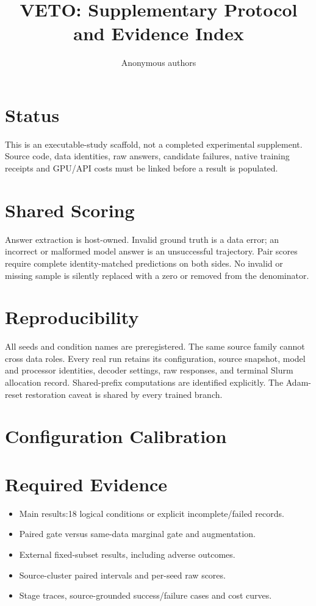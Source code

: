 \documentclass[10pt,twocolumn,letterpaper]{article}
\title{VETO: Supplementary Protocol and Evidence Index}
\author{Anonymous authors}
\begin{document}
\maketitle
\section{Status}
This is an executable-study scaffold, not a completed experimental supplement.
Source code, data identities, raw answers, candidate failures, native training
receipts and GPU/API costs must be linked before a result is populated.
\section{Shared Scoring}
Answer extraction is host-owned. Invalid ground truth is a data error; an
incorrect or malformed model answer is an unsuccessful trajectory. Pair scores
require complete identity-matched predictions on both sides. No invalid or
missing sample is silently replaced with a zero or removed from the denominator.
\section{Reproducibility}
All seeds and condition names are preregistered. The same source family cannot
cross data roles. Every real run retains its configuration, source snapshot,
model and processor identities, decoder settings, raw responses, and terminal
Slurm allocation record. Shared-prefix computations are identified explicitly.
The Adam-reset restoration caveat is shared by every trained branch.
\section{Configuration Calibration}
\section{Required Evidence}
\begin{itemize}
\item Main results:18 logical conditions or explicit incomplete/failed records.
\item Paired gate versus same-data marginal gate and augmentation.
\item External fixed-subset results, including adverse outcomes.
\item Source-cluster paired intervals and per-seed raw scores.
\item Stage traces, source-grounded success/failure cases and cost curves.
\end{itemize}
\end{document}
